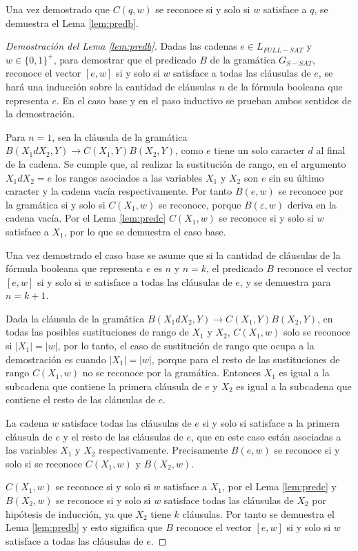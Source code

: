 \documentclass[12pt]{article}
\begin{document}
Una vez demostrado que $C(q,w)$ se reconoce si y solo si $w$ satisface a $q$, se demuestra el Lema \ref{lem:predb}.

\begin{proof}[Demostración del Lema \ref{lem:predb}]
    Dadas las cadenas $e\in L_{FULL-SAT}$ y $w\in \{0,1\}^+$, para demostrar que el predicado $B$ de la gramática $G_{S-SAT}$, reconoce el vector $[e,w]$  si y solo si $w$ satisface a todas las cláusulas de $e$,
    se hará una inducción sobre la cantidad de cláusulas $n$ de la fórmula booleana que representa $e$. En el caso base y en el paso inductivo
    se prueban ambos sentidos de la demostración.
    
    Para $n=1$, sea la cláusula de la gramática $B(X_1dX_2,Y)\to C(X_1,Y) B(X_2,Y)$, como $e$ tiene un solo caracter $d$ al final de la cadena. Se cumple que, al realizar la sustitución de rango, en el argumento $X_1dX_2=e$ los 
    rangos asociados a las variables $X_1$ y $X_2$ son $e$ sin su último caracter y la cadena vacía respectivamente. Por tanto $B(e,w)$ se reconoce por la gramática si y solo si $C(X_1,w)$ se reconoce, porque $B(\varepsilon, w)$ deriva en la cadena vacía. Por el Lema \ref{lem:predc} $C(X_1,w)$ se reconoce si y solo si $w$ satisface a $X_1$, por lo que se demuestra el caso base. 
    
    Una vez demostrado el caso base se asume que si la cantidad de cláusulas de la fórmula booleana que representa $e$ es $n$ y $n=k$, el predicado $B$ reconoce el vector $[e,w]$  si y solo si $w$ satisface a todas las cláusulas de $e$, y se demuestra para $n=k+1$.
    
    Dada la cláusula de la gramática $B(X_1dX_2,Y)\to C(X_1,Y) B(X_2,Y)$, en todas las posibles sustituciones de rango de $X_1$ y $X_2$, $C(X_1,w)$ solo se reconoce si $|X_1|=|w|$, por lo tanto, el caso de sustitución de rango que ocupa a la demostración es cuando $|X_1|=|w|$, porque para el resto de las sustituciones de rango $C(X_1,w)$ no se reconoce por la gramática.
    Entonces $X_1$ es igual a la subcadena que contiene la primera cláusula de $e$ y $X_2$ es igual a la subcadena que contiene el resto de las cláusulas de $e$.
    
    La cadena $w$ satisface todas las cláusulas de $e$ si y solo si satisface a la primera cláusula de $e$ y el resto de las cláusulas de $e$, que en este caso están asociadas a las variables $X_1$ y $X_2$ respectivamente.  Precisamente $B(e,w)$ se reconoce si y solo si se reconoce $C(X_1,w)$ y $B(X_2,w)$.
    
    $C(X_1,w)$ se reconoce si y solo si $w$ satisface a $X_1$, por el Lema \ref{lem:predc} y $B(X_2,w)$ se reconoce si y solo si $w$ satisface todas las cláusulas de $X_2$ por hipótesis de inducción, ya que $X_2$ tiene $k$ cláusulas. Por tanto se demuestra el Lema \ref{lem:predb} y esto significa que $B$ reconoce el vector $[e,w]$  si y solo si $w$ satisface a todas las cláusulas de $e$. 
\end{proof}
\end{document}
